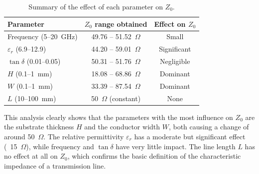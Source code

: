 \begin{table}[h]
\centering
\begin{tabular}{lcc}
\hline
\textbf{Parameter} & \textbf{$Z_0$ range obtained} & \textbf{Effect on $Z_0$} \\
\hline
Frequency (5--20~GHz)      & 49.76 -- 51.52~$\Omega$ & Small        \\
$\varepsilon_r$ (6.9--12.9)& 44.20 -- 59.01~$\Omega$ & Significant  \\
$\tan\delta$ (0.01--0.05)  & 50.31 -- 51.76~$\Omega$ & Negligible   \\
$H$ (0.1--1~mm)            & 18.08 -- 68.86~$\Omega$ & Dominant     \\
$W$ (0.1--1~mm)            & 33.39 -- 87.54~$\Omega$ & Dominant     \\
$L$ (10--100~mm)           & 50~$\Omega$ (constant)  & None         \\
\hline
\end{tabular}
\caption{Summary of the effect of each parameter on $Z_0$.}
\label{tab:synthese_minitask1}
\end{table}

This analysis clearly shows that the parameters with the most influence on $Z_0$ are the 
substrate thickness $H$ and the conductor width $W$, both causing a change of around 
50~$\Omega$. The relative permittivity $\varepsilon_r$ has a moderate but significant 
effect (~15~$\Omega$), while frequency and $\tan\delta$ have very little impact. The line 
length $L$ has no effect at all on $Z_0$, which confirms the basic definition of the 
characteristic impedance of a transmission line.